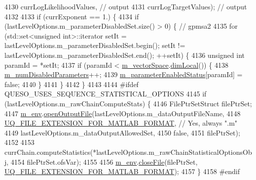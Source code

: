 \begin{DoxyCode}
4130               currLogLikelihoodValues, \textcolor{comment}{// output}
4131               currLogTargetValues);    \textcolor{comment}{// output}
4132 
4133     \textcolor{keywordflow}{if} (currExponent == 1.) \{
4134       \textcolor{keywordflow}{if} (lastLevelOptions.m\_parameterDisabledSet.size() > 0) \{ \textcolor{comment}{// gpmsa2}
4135         \textcolor{keywordflow}{for} (std::set<unsigned int>::iterator setIt = lastLevelOptions.m\_parameterDisabledSet.begin(); 
      setIt != lastLevelOptions.m\_parameterDisabledSet.end(); ++setIt) \{
4136           \textcolor{keywordtype}{unsigned} \textcolor{keywordtype}{int} paramId = *setIt;
4137           \textcolor{keywordflow}{if} (paramId < \hyperlink{class_q_u_e_s_o_1_1_m_l_sampling_a7bc4c72f65ba9166ed94a6e198b0915b}{m\_vectorSpace}.\hyperlink{class_q_u_e_s_o_1_1_vector_space_a5829a1f4f996f8307c840b705144d666}{dimLocal}()) \{
4138             \hyperlink{class_q_u_e_s_o_1_1_m_l_sampling_afbe27e6149562020663b72da6592d933}{m\_numDisabledParameters}++;
4139             \hyperlink{class_q_u_e_s_o_1_1_m_l_sampling_ac76690384f70d74b8662faf7a051449e}{m\_parameterEnabledStatus}[paramId] = \textcolor{keyword}{false};
4140           \}
4141         \}
4142       \}
4143 
4144 \textcolor{preprocessor}{#ifdef QUESO\_USES\_SEQUENCE\_STATISTICAL\_OPTIONS}
4145 \textcolor{preprocessor}{}      \textcolor{keywordflow}{if} (lastLevelOptions.m\_rawChainComputeStats) \{
4146         FilePtrSetStruct filePtrSet;
4147         \hyperlink{class_q_u_e_s_o_1_1_m_l_sampling_a13f1ca4fe9f94822fe572a743eaced1d}{m\_env}.\hyperlink{class_q_u_e_s_o_1_1_base_environment_ab8fe853074f12ea34e18724119a2fc75}{openOutputFile}(lastLevelOptions.m\_dataOutputFileName,
4148                              \hyperlink{_defines_8h_ac440026eff7deb1c1eed1eea0e8e36ba}{UQ\_FILE\_EXTENSION\_FOR\_MATLAB\_FORMAT}, \textcolor{comment}{//
       Yes, always ".m"}
4149                              lastLevelOptions.m\_dataOutputAllowedSet,
4150                              \textcolor{keyword}{false},
4151                              filePtrSet);
4152 
4153         currChain.computeStatistics(*lastLevelOptions.m\_rawChainStatisticalOptionsObj,
4154                                     filePtrSet.ofsVar);
4155 
4156         \hyperlink{class_q_u_e_s_o_1_1_m_l_sampling_a13f1ca4fe9f94822fe572a743eaced1d}{m\_env}.\hyperlink{class_q_u_e_s_o_1_1_base_environment_ab712bff194ddd91459d4ea8715c77e8b}{closeFile}(filePtrSet,
      \hyperlink{_defines_8h_ac440026eff7deb1c1eed1eea0e8e36ba}{UQ\_FILE\_EXTENSION\_FOR\_MATLAB\_FORMAT});
4157       \}
4158 \textcolor{preprocessor}{#endif}

\end{DoxyCode}
